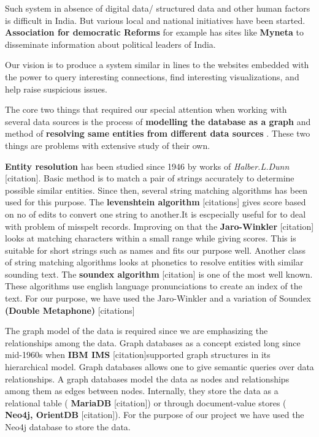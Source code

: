 Such system in absence of digital data/ structured data and other human factors is difficult in India. But various local and national initiatives have been started. \textbf{Association for democratic Reforms} \cite{ADR} for example has sites like \textbf{Myneta} \cite{MyNeta} to disseminate information about political leaders of India.	

Our vision is to produce a system similar in lines to the websites embedded with the power to query interesting connections, find interesting visualizations, and help raise suspicious issues.

The core two things that required our special attention when working with several data sources is the process of \textbf{ modelling the database as a graph } and method of \textbf{ resolving same entities from different data sources }. These two things are problems with extensive study of their own.

\textbf{ Entity resolution } has been studied since 1946 by works of \emph{ Halber.L.Dunn }[citation]. Basic method is to match a pair of strings accurately to determine possible similar entities. Since then, several string matching algorithms has been used for this purpose. The \textbf{ levenshtein algorithm } [citations] gives score based on no of edits to convert one string to another.It is escpecially useful for to deal with problem of misspelt records. Improving on that the \textbf{ Jaro-Winkler} [citation] looks at matching characters within a small range while giving scores. This is suitable for short strings such as names and fits our purpose well. Another class of string matching algorithms looks at phonetics to resolve entities with similar sounding text. The \textbf{ soundex algorithm }[citation] is one of the most well known. These algorithms use english language pronunciations to create an index of the text. For our purpose, we have used the Jaro-Winkler and a variation of Soundex \textbf{ (Double Metaphone) }[citations]

    The graph model of the data is required since we are emphasizing the relationships among the data. Graph databases as a concept existed long since mid-1960s when \textbf{ IBM IMS } [citation]supported graph structures in its hierarchical model. Graph databases allows one to give semantic queries  over data relationships. A graph databases model the data as nodes and relationships among them as edges between nodes. Internally, they store the data as a relational table (\textbf{ MariaDB }[citation]) or through document-value stores (\textbf{ Neo4j, OrientDB }[citation]). For the purpose of our project we have used the Neo4j database to store the data. 

